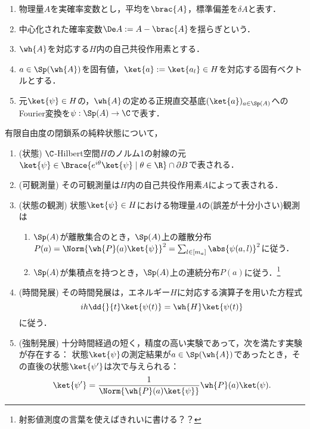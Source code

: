 \documentclass[uplatex,dvipdfmx]{jsreport}
\begin{document}
\begin{notation}\mbox{}
    \begin{enumerate}
        \item 物理量$A$を実確率変数とし，平均を$\brac{A}$，標準偏差を$\delta A$と表す．
        \item 中心化された確率変数$\De A:=A-\brac{A}$を揺らぎという．
        \item $\wh{A}$を対応する$H$内の自己共役作用素とする．
        \item $a\in\Sp(\wh{A})$を固有値，$\ket{a}:=\ket{a_l}\in H$を対応する固有ベクトルとする．
        \item 元$\ket{\psi}\in H$の，$\wh{A}$の定める正規直交基底$(\ket{a})_{a\in\Sp(A)}$へのFourier変換を$\psi:\Sp(A)\to\C$で表す．
    \end{enumerate}
\end{notation}

\begin{axiom}
    有限自由度の閉鎖系の純粋状態について，
    \begin{enumerate}
        \item (状態) $\C$-Hilbert空間$H$のノルム1の射線の元$\ket{\psi}\in\Brace{e^{i\theta}\ket{\psi}\mid\theta\in\R}\cap\partial B$で表される．
        \item (可観測量) その可観測量は$H$内の自己共役作用素$A$によって表される．
        \item (状態の観測) 状態$\ket{\psi}\in H$における物理量$A$の(誤差が十分小さい)観測は
        \begin{enumerate}
            \item $\Sp(A)$が離散集合のとき，$\Sp(A)$上の離散分布$P(a)=\Norm{\wh{P}(a)\ket{\psi}}^2=\sum_{l\in[m_a]}\abs{\psi(a,l)}^2$に従う．
            \item $\Sp(A)$が集積点を持つとき，$\Sp(A)$上の連続分布$P(a)$に従う．\footnote{射影値測度の言葉を使えばきれいに書ける？？}
        \end{enumerate}
        \item (時間発展) その時間発展は，エネルギー$H$に対応する演算子を用いた方程式
        \[ih\dd{}{t}\ket{\psi(t)}=\wh{H}\ket{\psi(t)}\]
        に従う．
        \item (強制発展) 十分時間経過の短く，精度の高い実験であって，次を満たす実験が存在する：
        状態$\ket{\psi}$の測定結果が$a\in\Sp(\wh{A})$であったとき，その直後の状態$\ket{\psi'}$は次で与えられる：
        \[\ket{\psi'}=\frac{1}{\Norm{\wh{P}(a)\ket{\psi}}}\wh{P}(a)\ket(\psi).\]
    \end{enumerate}
\end{axiom}
\end{document}
